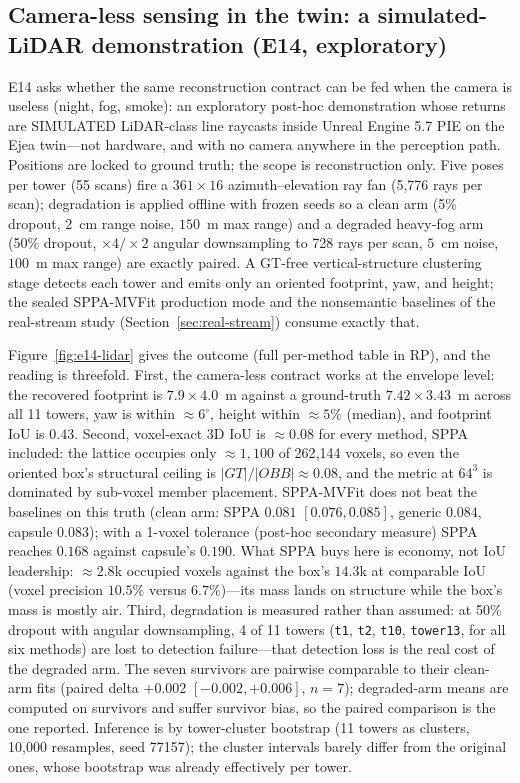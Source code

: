 \documentclass[11pt,a4paper]{article}
\begin{document}
\subsection{Camera-less sensing in the twin: a simulated-LiDAR demonstration (E14, exploratory)}
\label{sec:e14}

E14 asks whether the same reconstruction contract can be fed when the camera
is useless (night, fog, smoke): an exploratory post-hoc demonstration whose
returns are SIMULATED LiDAR-class line raycasts inside Unreal Engine 5.7 PIE
on the Ejea twin---not hardware, and with no camera anywhere in the
perception path. Positions are locked to ground truth; the scope is
reconstruction only. Five poses per tower (55 scans) fire a
\(361{\times}16\) azimuth--elevation ray fan (5{,}776 rays per scan);
degradation is applied offline with frozen seeds so a clean arm (5\%
dropout, \(2\)~cm range noise, \(150\)~m max range) and a degraded
heavy-fog arm (50\% dropout, \({\times}4/{\times}2\) angular downsampling to
728 rays per scan, \(5\)~cm noise, \(100\)~m max range) are exactly paired.
A GT-free vertical-structure clustering stage detects each tower and emits
only an oriented footprint, yaw, and height; the sealed SPPA-MVFit
production mode and the nonsemantic baselines of the real-stream study
(Section~\ref{sec:real-stream}) consume exactly that.

Figure~\ref{fig:e14-lidar} gives the outcome (full per-method table in RP),
and the
reading is threefold. First, the camera-less contract works at the
envelope level: the recovered footprint is \(7.9{\times}4.0\)~m against a
ground-truth \(7.42{\times}3.43\)~m across all 11 towers, yaw is within
\(\approx\)\(6^{\circ}\), height within \(\approx\)\(5\%\) (median), and
footprint IoU is \(0.43\). Second, voxel-exact 3D IoU is \(\approx\)\(0.08\)
for every method, SPPA included: the lattice occupies only
\(\approx\)\(1{,}100\) of 262{,}144 voxels, so even the oriented box's
structural ceiling is \(|GT|/|OBB| \approx 0.08\), and the metric at
\(64^3\) is dominated by sub-voxel member placement. SPPA-MVFit does not
beat the baselines on this truth (clean arm: SPPA \(0.081\)
\([0.076,0.085]\), generic \(0.084\), capsule \(0.083\)); with a 1-voxel
tolerance (post-hoc secondary measure) SPPA reaches \(0.168\) against
capsule's \(0.190\). What SPPA buys here is economy, not IoU leadership:
\(\approx\)\(2.8\)k occupied voxels against the box's \(14.3\)k at
comparable IoU (voxel precision \(10.5\%\) versus \(6.7\%\))---its mass
lands on structure while the box's mass is mostly air. Third, degradation is
measured rather than assumed: at 50\% dropout with angular downsampling,
4 of 11 towers (\texttt{t1}, \texttt{t2}, \texttt{t10}, \texttt{tower13},
for all six methods) are lost to detection failure---that detection loss is the
real cost of the degraded arm. The seven survivors are pairwise comparable
to their clean-arm fits (paired delta \(+0.002\) \([-0.002,+0.006]\),
\(n{=}7\)); degraded-arm means are computed on survivors and suffer survivor
bias, so the paired comparison is the one reported. Inference is by
tower-cluster bootstrap (11 towers as clusters, 10{,}000 resamples, seed
77157); the cluster intervals barely differ from the original ones, whose
bootstrap was already effectively per tower.
\end{document}
